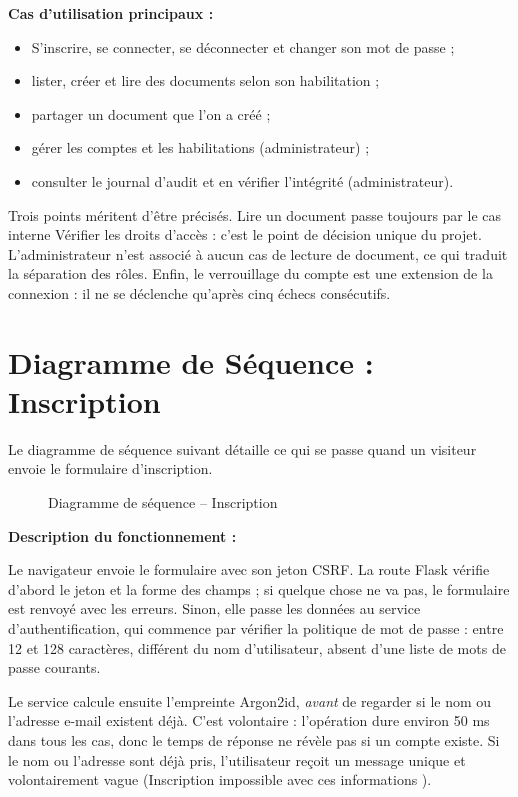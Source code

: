 \documentclass[12pt,a4paper]{report}
\begin{document}
\textbf{Cas d'utilisation principaux :}
\begin{itemize}
  \item S'inscrire, se connecter, se déconnecter et changer son mot de passe ;
  \item lister, créer et lire des documents selon son habilitation ;
  \item partager un document que l'on a créé ;
  \item gérer les comptes et les habilitations (administrateur) ;
  \item consulter le journal d'audit et en vérifier l'intégrité (administrateur).
\end{itemize}

Trois points méritent d'être précisés. Lire un document passe toujours par le cas interne \og Vérifier les droits d'accès \fg{} : c'est le point de décision unique du projet. L'administrateur n'est associé à aucun cas de lecture de document, ce qui traduit la séparation des rôles. Enfin, le verrouillage du compte est une extension de la connexion : il ne se déclenche qu'après cinq échecs consécutifs.

\section{Diagramme de Séquence : Inscription}

Le diagramme de séquence suivant détaille ce qui se passe quand un visiteur envoie le formulaire d'inscription.

\begin{figure}[H]
\centering
{}
\caption{Diagramme de séquence -- Inscription}
\end{figure}

\textbf{Description du fonctionnement :}

Le navigateur envoie le formulaire avec son jeton CSRF. La route Flask vérifie d'abord le jeton et la forme des champs ; si quelque chose ne va pas, le formulaire est renvoyé avec les erreurs. Sinon, elle passe les données au service d'authentification, qui commence par vérifier la politique de mot de passe : entre 12 et 128 caractères, différent du nom d'utilisateur, absent d'une liste de mots de passe courants.

Le service calcule ensuite l'empreinte Argon2id, \emph{avant} de regarder si le nom ou l'adresse e-mail existent déjà. C'est volontaire : l'opération dure environ 50 ms dans tous les cas, donc le temps de réponse ne révèle pas si un compte existe. Si le nom ou l'adresse sont déjà pris, l'utilisateur reçoit un message unique et volontairement vague (\og Inscription impossible avec ces informations \fg).
\end{document}
